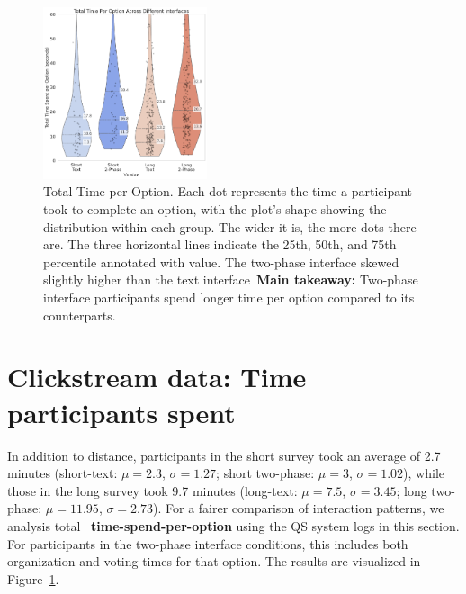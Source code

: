 \begin{figure}[H]
    \centering
    \includegraphics[width=0.43\textwidth, trim=2 0 0 0, clip]{content/image/time/Total Time Per Option Across Different Interfaces.pdf}
    \caption{Total Time per Option. Each dot represents the time a participant took to complete an option, with the plot's shape showing the distribution within each group. The wider it is, the more dots there are. The three horizontal lines indicate the 25th, 50th, and 75th percentile annotated with value. The two-phase interface skewed slightly higher than the text interface~\textbf{Main takeaway: } Two-phase interface participants spend longer time per option compared to its counterparts.}
    \vspace{-8pt}
    \label{fig:total_time}
\end{figure}

\section{Clickstream data: Time participants spent}
\label{sec:timeAnalysis}

In addition to distance, participants in the short survey took an average of 2.7 minutes (short-text: $\mu=2.3$, $\sigma=1.27$; short two-phase: $\mu=3$, $\sigma=1.02$), while those in the long survey took 9.7 minutes (long-text: $\mu=7.5$, $\sigma=3.45$; long two-phase: $\mu=11.95$, $\sigma=2.73$). For a fairer comparison of interaction patterns, we analysis total ~\textbf{time-spend-per-option} using the QS system logs in this section. For participants in the two-phase interface conditions, this includes both organization and voting times for that option. The results are visualized in Figure~\ref{fig:total_time}.

